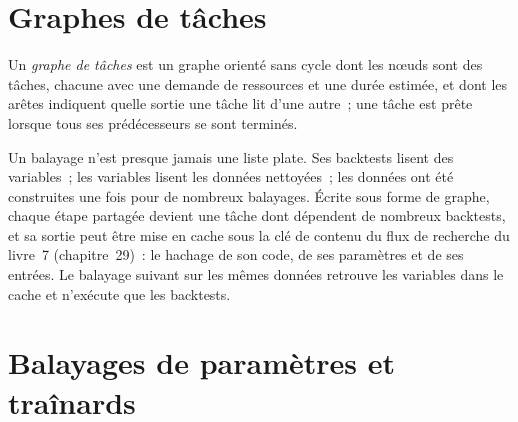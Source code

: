 \label{lst:pl:distributed-compute-and-schedulers:stealing}

\section{Graphes de tâches}

\begin{definition}\label{def:pl:distributed-compute-and-schedulers:graph}
Un \emph{graphe de tâches} est un graphe orienté sans cycle dont les nœuds sont des tâches, chacune avec une demande de ressources et une
durée estimée, et dont les arêtes indiquent quelle sortie une tâche lit d'une autre~; une tâche est prête lorsque tous ses prédécesseurs se sont terminés.
\end{definition}

Un balayage n'est presque jamais une liste plate. Ses backtests lisent des variables~; les variables lisent les données nettoyées~; les données ont été construites une fois pour de nombreux balayages.
Écrite sous forme de graphe, chaque étape partagée devient une tâche dont dépendent de nombreux backtests, et sa sortie peut être mise en cache sous la clé de contenu du
flux de recherche du livre~7 (chapitre~29)~: le hachage de son code, de ses paramètres et de ses entrées. Le balayage suivant sur les mêmes données retrouve les variables
dans le cache et n'exécute que les backtests.

\section{Balayages de paramètres et traînards}

\begin{omfigure}

\label{fig:pl:distributed-compute-and-schedulers:graph}
\end{omfigure}

